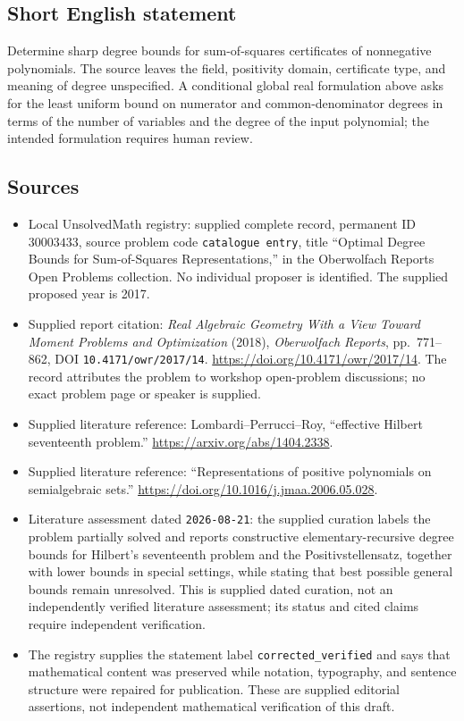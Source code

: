 \documentclass[11pt]{article}
\begin{document}
\subsection{Short English statement}
Determine sharp degree bounds for sum-of-squares certificates of nonnegative polynomials. The source leaves the field, positivity domain, certificate type, and meaning of degree unspecified. A conditional global real formulation above asks for the least uniform bound on numerator and common-denominator degrees in terms of the number of variables and the degree of the input polynomial; the intended formulation requires human review.
\subsection{Sources}
\begin{itemize}
\item Local UnsolvedMath registry: supplied complete record, permanent ID \(30003433\), source problem code \texttt{catalogue entry}, title ``Optimal Degree Bounds for Sum-of-Squares Representations,'' in the Oberwolfach Reports Open Problems collection. No individual proposer is identified. The supplied proposed year is 2017.
\item Supplied report citation: \emph{Real Algebraic Geometry With a View Toward Moment Problems and Optimization} (2018), \emph{Oberwolfach Reports}, pp.\ 771--862, DOI \texttt{10.4171/owr/2017/14}. \url{https://doi.org/10.4171/owr/2017/14}. The record attributes the problem to workshop open-problem discussions; no exact problem page or speaker is supplied.
\item Supplied literature reference: Lombardi--Perrucci--Roy, ``effective Hilbert seventeenth problem.'' \url{https://arxiv.org/abs/1404.2338}.
\item Supplied literature reference: ``Representations of positive polynomials on semialgebraic sets.'' \url{https://doi.org/10.1016/j.jmaa.2006.05.028}.
\item Literature assessment dated \texttt{2026-08-21}: the supplied curation labels the problem partially solved and reports constructive elementary-recursive degree bounds for Hilbert's seventeenth problem and the Positivstellensatz, together with lower bounds in special settings, while stating that best possible general bounds remain unresolved. This is supplied dated curation, not an independently verified literature assessment; its status and cited claims require independent verification.
\item The registry supplies the statement label \texttt{corrected\_verified} and says that mathematical content was preserved while notation, typography, and sentence structure were repaired for publication. These are supplied editorial assertions, not independent mathematical verification of this draft.
\end{itemize}
\end{document}
